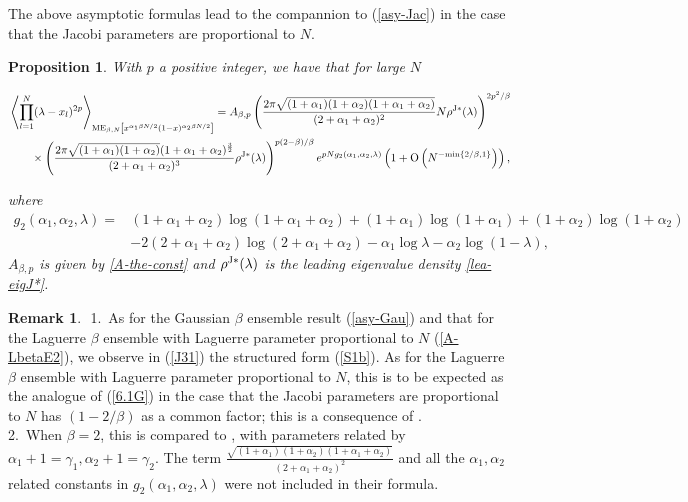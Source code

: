 \documentclass[11pt,a4paper]{article}
\numberwithin{equation}{section} %
\theoremstyle{plain}
\newtheorem{prop}{Proposition}
\theoremstyle{definition}
\newtheorem{remark}{Remark}
\numberwithin{prop}{section}
\numberwithin{cor}{section}
\numberwithin{remark}{section}
\begin{document}
The above asymptotic formulas lead to the compannion to (\ref{asy-Jac}) in the
case that the Jacobi parameters are proportional to $N$.
\begin{prop}\label{P5.2} With $p$ a positive integer, we have that for large $N$
\begin{small}
    \begin{align}\label{J31}
\begin{aligned}
    &\left\langle\prod_{l=1}^{N}(\lambda-x_l)^{2p}\right\rangle_{\mathrm{ME}_{\beta, N}\left[x^{\alpha_1\beta N/2}(1-x)^{\alpha_2\beta N/2}\right]}=A_{\beta,p}\left(\frac{2\pi\sqrt{(1+\alpha_1)(1+\alpha_2)(1+\alpha_1+\alpha_2)}}{(2+\alpha_1+\alpha_2)^{2}}N\rho^{\rm J*}(\lambda)\right)^{2p^2/\beta}\\
&\qquad\times\left(\frac{2\pi\sqrt{(1+\alpha_1)(1+\alpha_2)}(1+\alpha_1+\alpha_2)^{\frac{3}{2}}}{(2+\alpha_1+\alpha_2)^{3}}\rho^{\rm J*}(\lambda)\right)^{p(2-\beta)/\beta}
    e^{pNg_2(\alpha_1,\alpha_2,\lambda)}
    \left(1+\mathrm{O}\left( N^{-\mathrm{min}\{2/\beta,1\}}\right)\right),
\end{aligned}
\end{align}
\end{small}
    where
\begin{align}\label{g2}
    g_2(\alpha_1,\alpha_2,\lambda)=&(1+\alpha_1+\alpha_2)\log(1+\alpha_1+\alpha_2)+(1+\alpha_1)\log(1+\alpha_1)+(1+\alpha_2)\log(1+\alpha_2) \nonumber \\
&-2(2+\alpha_1+\alpha_2)\log(2+\alpha_1+\alpha_2)-\alpha_1\log\lambda-\alpha_2\log(1-\lambda),
\end{align}
$A_{\beta, p}$ is given by \eqref{A-the-const} and $\rho^{\rm J*}(\lambda)$ is the leading eigenvalue density \eqref{lea-eigJ*}.
\end{prop}

\begin{remark}\label{R-C2} ${}$
1.~As for the Gaussian $\beta$ ensemble result
(\ref{asy-Gau}) and that for the Laguerre
$\beta$ ensemble with Laguerre parameter
proportional to $N$ 
(\ref{A-LbetaE2}), we observe in (\ref{J31})
the structured form (\ref{S1b}).
As for the
Laguerre
$\beta$ ensemble with Laguerre parameter
proportional to $N$, 
this is to be expected as the analogue of (\ref{6.1G}) in the case that the Jacobi parameters are proportional to $N$ has $(1-2/\beta)$ as a common
factor; this is a consequence of \cite[Prop.~4.8]{FRW17}. \\
2.~When $\beta=2$, this is compared to \cite[Theorem~4.3]{DL14}, with parameters related by $\alpha_1+1=\gamma_1, \alpha_2+1=\gamma_2$. The term $\frac{\sqrt{(1+\alpha_1)(1+\alpha_2)(1+\alpha_1+\alpha_2)}}{(2+\alpha_1+\alpha_2)^{2}}$ and all the $\alpha_1,\alpha_2$ related constants in $g_2(\alpha_1,\alpha_2,\lambda)$ were not included in their formula.



\end{remark}
\end{document}
